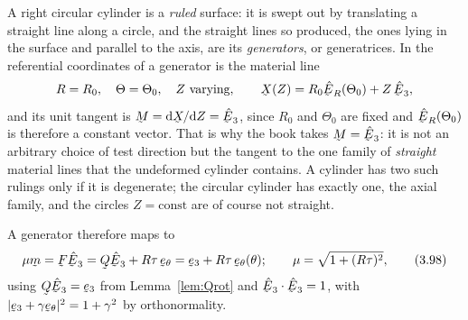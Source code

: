 \begin{remark}\label{rem:generator}
A right circular cylinder is a \emph{ruled} surface: it is swept out by
translating a straight line along a circle, and the straight lines so
produced, the ones lying in the surface and parallel to the axis, are its
\emph{generators}, or generatrices. In the referential coordinates of
 a generator is the material line
\[
   R=R_{0},\quad \Theta=\Theta_{0},\quad Z\ \text{varying},
   \qquad
   \bX(Z)=R_{0}\hER(\Theta_{0})+Z\,\hbE_{3},
\]
and its unit tangent is
$\bM=\dl\bX/\dl Z=\hbE_{3}$, since $R_{0}$ and $\Theta_{0}$ are fixed and
$\hER(\Theta_{0})$ is therefore a constant vector. That is why the book
takes $\bM=\hbE_{3}$: it is not an arbitrary choice of test direction but
the tangent to the one family of \emph{straight} material lines that the
undeformed cylinder contains. A cylinder has two such rulings only if it
is degenerate; the circular cylinder has exactly one, the axial family,
and the circles $Z=\text{const}$ are of course not straight.
\end{remark}

A generator therefore maps to
\begin{equation}
   \mu\bm=\bF\hbE_{3}=\bQ\hbE_{3}+R\tau\,\bet
        =\be_{3}+R\tau\,\bet(\theta);\qquad
   \mu=\sqrt{1+(R\tau)^{2}},
   \tag{3.98}\label{eq:3.98}
\end{equation}
using $\bQ\hbE_{3}=\be_{3}$ from Lemma~\ref{lem:Qrot} and
$\ip{\hbE_{3}}{\hbE_{3}}=1$, with
$|\be_{3}+\gamma\bet|^{2}=1+\gamma^{2}$ by orthonormality.

